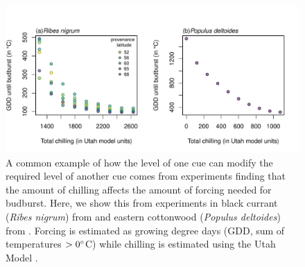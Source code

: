 \documentclass[11pt,letter]{article}
\begin{document}
\clearpage
\begin{figure}
\centering
\includegraphics[width=1\textwidth]{..//..//analyses/limitingcues/figures/gddbyutahpretty.pdf}
\caption{A common example of how the level of one cue can modify the required level of another cue comes from experiments finding that the amount of chilling affects the amount of forcing needed for budburst. Here, we show this from experiments in black currant (\emph{Ribes nigrum}) from \citet{Sonsteby:2014aa} and eastern cottonwood (\emph{Populus deltoides}) from \citet{Thielges:1976aa}. Forcing is estimated as growing degree days (GDD, sum of temperatures $>0\degree$C) while chilling is estimated using the Utah Model \citep[see][]{richardson1974}.} %
  \label{fig:gddbyutah} 
\end{figure}
\end{document}
